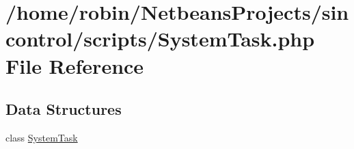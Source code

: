 \hypertarget{scripts_2_system_task_8php}{}\section{/home/robin/\+Netbeans\+Projects/sincontrol/scripts/\+System\+Task.php File Reference}
\label{scripts_2_system_task_8php}
\subsection*{Data Structures}
\begin{DoxyCompactItemize}
\item 
class \hyperlink{class_system_task}{System\+Task}
\end{DoxyCompactItemize}
